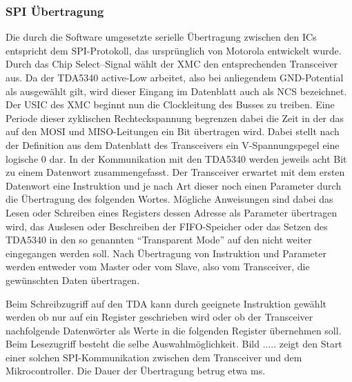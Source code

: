 \subsubsection*{SPI Übertragung}
Die durch die Software umgesetzte serielle Übertragung zwischen den \acp{IC} entspricht dem \ac{SPI}-Protokoll, das ursprünglich von Motorola entwickelt wurde\cite{BuchSPI}. Durch das Chip Select–Signal wählt der XMC den entsprechenden Transceiver aus. Da der TDA5340 active-Low arbeitet, also bei anliegendem \ac{GND}-Potential als ausgewählt gilt, wird dieser Eingang im Datenblatt auch als \acf{NCS} bezeichnet. 
Der \ac{USIC} des XMC beginnt nun die Clockleitung des Busses zu treiben. Eine Periode dieser zyklischen Rechteckspannung begrenzen dabei die Zeit in der das auf den \ac{MOSI} und \ac{MISO}-Leitungen ein Bit übertragen wird. Dabei stellt nach der Definition aus dem Datenblatt des Transceivers ein \unit[0]{V}-Spannungspegel eine logische $0$ dar. In der Kommunikation mit den TDA5340 werden jeweils acht Bit zu einem Datenwort zusammengefasst. Der Transceiver erwartet mit dem ersten Datenwort eine Instruktion und je nach Art dieser noch einen Parameter durch die Übertragung des folgenden Wortes. Mögliche Anweisungen sind dabei das Lesen oder Schreiben eines Registers dessen Adresse als Parameter übertragen wird, das Auslesen oder Beschreiben der \ac{FIFO}-Speicher oder das Setzen des TDA5340 in den so genannten \enquote{Transparent Mode} auf den nicht weiter eingegangen werden soll. Nach Übertragung von Instruktion und Parameter werden entweder vom Master oder vom Slave, also vom Transceiver, die gewünschten Daten übertragen.

Beim Schreibzugriff auf den TDA kann durch geeignete Instruktion gewählt werden ob nur auf ein Register geschrieben wird oder ob der Transceiver nachfolgende Datenwörter als Werte in die folgenden Register übernehmen soll. 
Beim Lesezugriff besteht die selbe Auswahlmöglichkeit. Bild ..... zeigt den Start einer solchen \ac{SPI}-Kommunikation zwischen dem Transceiver und dem Mikrocontroller. Die Dauer der Übertragung betrug etwa \unit[0,26]{ms}.  %







